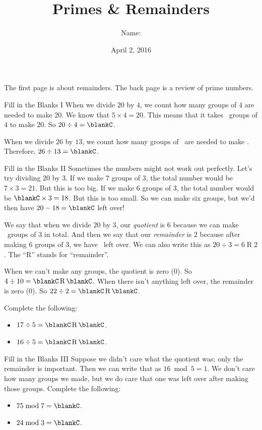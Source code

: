 \documentclass[12pt,letterpaper]{article}
\title{Primes \& Remainders}
\author{Name: \underline{\hspace{5cm}}}
\date{April 2, 2016}
\begin{document}
\maketitle

\thispagestyle{empty}

The first page is about remainders. The back page is a review of prime numbers.

\begin{problem}{Fill in the Blanks I}
 When we divide $20$ by $4$, we count how many groups of $4$ are needed to make
 $20$. We know that $5 \times 4 = 20$. This means that it takes \blankC\ groups
 of $4$ to make $20$. So $20 \div 4 = \blankC$.

 When we divide $26$ by $13$, we count how many groups of \blankC\ are needed to
 make \blankC. Therefore, $26 \div 13 = \blankC$.
\end{problem}

\begin{problem}{Fill in the Blanks II}
 Sometimes the numbers might not work out perfectly. Let's try dividing $20$ by
 $3$. If we make $7$ groups of $3$, the total number would be $7 \times 3 = 21$.
 But this is too big. If we make $6$ groups of $3$, the total number would be
 $\blankC \times 3 = 18$. But this is too small. So we can make six groups, but
 we'd then have $20 - 18 = \blankC$ left over!

 We say that when we divide $20$ by $3$, our \emph{quotient} is $6$ because we
 can make \blankC\ groups of $3$ in total. And then we say that our
 \emph{remainder} is $2$ because after making $6$ groups of $3$, we have
 \blankC\ left over. We can also write this as $20 \div 3 = 6 \operatorname{R}
 2$. The ``R'' stands for ``remainder''.

 When we can't make any groups, the quotient is zero ($0$). So $4 \div 10 =
 \blankC \operatorname{R} \blankC$. When there isn't anything left over, the
 remainder is zero ($0$). So $22 \div 2 = \blankC \operatorname{R} \blankC$.

 Complete the following: \begin{itemize}
  \item $17 \div 5 = \blankC \operatorname{R} \blankC$.
  \item $16 \div 5 = \blankC \operatorname{R} \blankC$.
 \end{itemize}
\end{problem}

\begin{problem}{Fill in the Blanks III}
 Suppose we didn't care what the quotient was; only the remainder is important.
 Then we can write that as $16 \bmod 5 = 1$. We don't care how many groups we
 made, but we do care that one was left over after making those groups. Complete
 the following:

 \begin{itemize}
  \item $75 \bmod 7 = \blankC$.
  \item $24 \bmod 3 = \blankC$.
 \end{itemize}
\end{problem}
\end{document}
